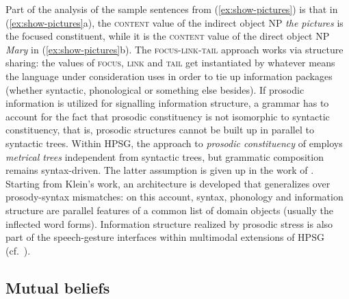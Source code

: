 \documentclass[output=paper,biblatex,babelshorthands,newtxmath,draftmode,colorlinks,citecolor=brown]{langscibook}
\begin{document}
\largerpage[1]
Part of the analysis of the sample sentences from (\ref{ex:show-pictures}) is that in (\ref{ex:show-pictures}a), the \textsc{content} value of the indirect object NP \textit{the pictures} is the focused constituent, while it is the \textsc{content} value of the direct object NP \textit{Mary} in (\ref{ex:show-pictures}b).
%
The \textsc{focus-link-tail} approach works via structure sharing: the values of \textsc{focus}, \textsc{link} and \textsc{tail} get instantiated by whatever means the language under consideration uses in order to tie up information packages (whether syntactic, phonological or something else besides).
%
If prosodic information is utilized for signalling information structure, a grammar has to account for the fact that prosodic constituency is not isomorphic to syntactic constituency, that is, prosodic structures cannot be built up in parallel to syntactic trees. 
%
Within HPSG, the approach to \emph{prosodic constituency} of \citet{Klein:2000} employs \emph{metrical trees} independent from syntactic trees, but grammatic composition remains syntax-driven.
%
The latter assumption is given up in the work of \citet{Haji-Abdolhosseini2003a}. %
%
Starting from Klein's work, an architecture is developed that generalizes over prosody-syntax
mismatches: on this account, syntax, phonology and information structure are parallel features of a
common list of domain objects (usually the inflected word forms).
%
Information structure realized by prosodic stress is also part of the speech-gesture interfaces within multimodal extensions of HPSG (cf.\ ).



\subsection{Mutual beliefs}
\label{sec:mutual-beliefs}
\end{document}
